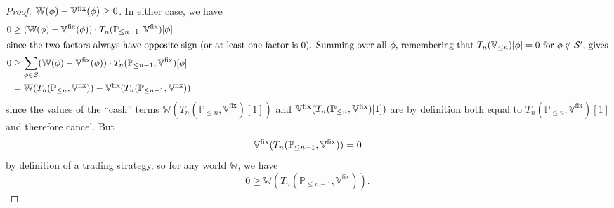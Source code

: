 \documentclass[authordate,onecolumn,noenvironments]{miri-tech-article}
\numberwithin{equation}{subsection}
\newcommand{\nn}{n}
\newcommand{\trade}{T}%
\newcommand{\append}{,}
\newcommand{\adj}{{{\operatorname{fix}}}}
\newcommand{\BelState}{\mathbb{P}}
\newcommand{\Valuation}{\mathbb{V}}
\newcommand{\pt}{\BelState}
\newcommand{\World}{\mathbb{W}}
\newcommand{\Sentences}{\mathcal{S}}
\begin{document}
\begin{proof}
$\World(\phi) - \Valuation^\adj\-(\phi) \geq 0$.  In either case, we have
%
\begin{align*}
%  
0 &\geq (\World(\phi)-\Valuation^\adj\-(\phi))\cdot \trade_\nn(\pt_{\le \nn-1}\append\Valuation^\adj)[\phi]\\
%
\intertext{since the two factors always have opposite sign (or at least one factor is 0).  Summing over all $\phi$, remembering that $\trade_\nn(\Valuation_{\leq \nn})[\phi]=0$ for $\phi \notin \Sentences'$, gives}
%
0 &\geq \sum_{\phi\in\Sentences} (\World(\phi)-\Valuation^\adj\-(\phi))\cdot \trade_\nn(\pt_{\le \nn-1}\append\Valuation^\adj)[\phi]
\nonumber\\
&=\World(\trade_\nn(\pt_{\leq n}\append\Valuation^\adj)) - \Valuation^\adj\-(\trade_\nn(\pt_{\le \nn-1}\append\Valuation^\adj))
\end{align*}
since the values of the ``cash'' terms $\World(\trade_\nn(\pt_{\leq n}\append\Valuation^\adj)[1])$ and $\Valuation^\adj\-(\trade_\nn(\pt_{\leq n}\append\Valuation^\adj)[1])$ are by definition both equal to $\trade_\nn(\pt_{\leq n}\append\Valuation^\adj)[1]$ and therefore cancel. But
\[
    \Valuation^\adj\-(\trade_\nn(\pt_{\le \nn-1}\append\Valuation^\adj)) = 0
\]
by definition of a trading strategy, so for any world $\World$, we have
\[
0\ge\World(\trade_\nn(\pt_{\le \nn-1}\append\Valuation^\adj)).
\]
\end{proof}
\end{document}
